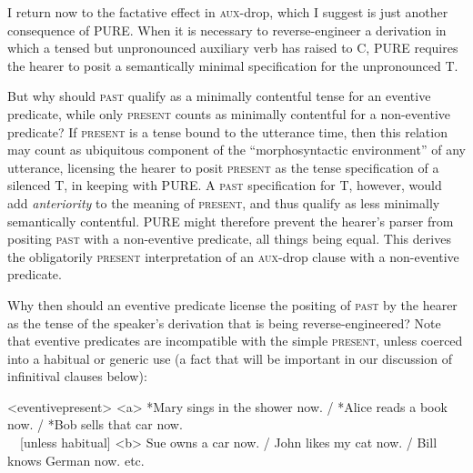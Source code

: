\documentclass[output=paper]{langscibook}
\begin{document}
I return now to the factative effect in \textsc{aux-}drop, which I suggest is just another consequence of PURE. When it is necessary to reverse-engineer a derivation in which a tensed but unpronounced auxiliary verb has raised to C, PURE requires the hearer to posit a semantically minimal specification for the unpronounced T. 

But why should \textsc{past} qualify as a minimally contentful tense for an eventive predicate, while only \textsc{present }counts as minimally contentful for a non-eventive predicate? If \textsc{present }is a tense bound to the utterance time, then this relation may count as ubiquitous component of the “morphosyntactic environment” of any utterance, licensing the hearer to posit \textsc{present }as the tense specification of a silenced T, in keeping with PURE. A \textsc{past }specification for T, however, would add\textit{ anteriority} to the meaning of \textsc{present}, and thus qualify as less minimally semantically contentful. PURE might therefore prevent the hearer's parser from positing \textsc{past} with a non-eventive predicate, all things being equal. This derives the obligatorily \textsc{present }interpretation of an \textsc{aux-}drop clause with a non-eventive predicate.

Why then should an eventive predicate license the positing of \textsc{past }by the hearer\textsc{ }as the tense of the speaker's derivation that is being reverse-engineered? Note that eventive predicates are incompatible with the simple\textsc{ present}, unless coerced into a habitual or generic use (a fact that will be important in our discussion of infinitival clauses below):

\pex<eventivepresent>
\a<a> *Mary sings in the shower now. / *Alice reads a book now. / *Bob sells that car now.\\	~~[unless habitual]
\a<b> Sue owns a car now. / John likes my cat now. / Bill knows German now. etc.
\xe
\end{document}
